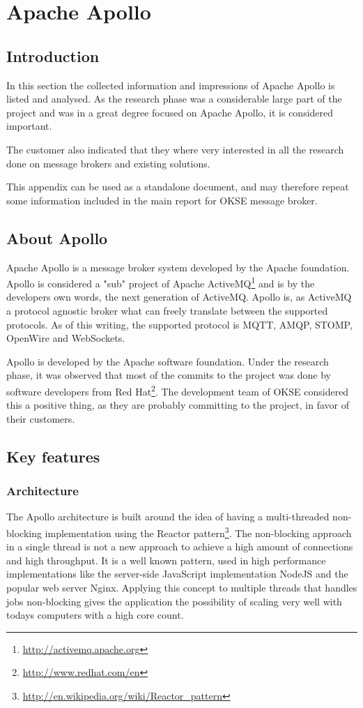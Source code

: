 \chapter{Apache Apollo}
\label{appendix:apache-apollo}

\section{Introduction}
In this section the collected information and impressions of Apache Apollo is listed and analysed. As the research phase was a considerable large part of the project and was in a great degree focused on Apache Apollo, it is considered important.

The customer also indicated that they where very interested in all the research done on message brokers and existing solutions.

This appendix can be used as a standalone document, and may therefore repeat some information included in the main report for OKSE message broker.

\section{About Apollo}
Apache Apollo is a message broker system developed by the Apache foundation. Apollo is considered a "sub" project of Apache ActiveMQ\footnote{\url{http://activemq.apache.org}} and is by the developers own words, the next generation of ActiveMQ. Apollo is, as ActiveMQ a protocol agnostic broker what can freely translate between the supported protocols. As of this writing, the supported protocol is MQTT, AMQP, STOMP, OpenWire and WebSockets. 

Apollo is developed by the Apache software foundation. Under the research phase, it was observed that most of the commits to the project was done by software developers from Red Hat\footnote{\url{http://www.redhat.com/en}}. The development team of OKSE considered this a positive thing, as they are probably committing to the project, in favor of their customers. 

\section{Key features}

\subsection{Architecture}
The Apollo architecture is built around the idea of having a multi-threaded non-blocking implementation using the Reactor pattern\footnote{\url{http://en.wikipedia.org/wiki/Reactor_pattern}}. The non-blocking approach in a single thread is not a new approach to achieve a high amount of connections and high throughput. It is a well known pattern, used in high performance implementations like the server-side JavaScript implementation NodeJS and the popular web server Nginx. Applying this concept to multiple threads that handles jobs non-blocking gives the application the possibility of scaling very well with todays computers with a high core count. 


